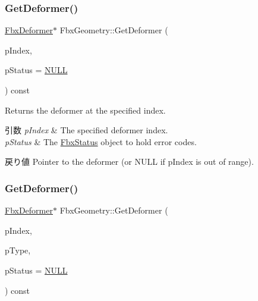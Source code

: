 \subsubsection{\texorpdfstring{Get\+Deformer()}{GetDeformer()}\hspace{0.1cm}{\footnotesize\ttfamily [1/2]}}
{\footnotesize\ttfamily \hyperlink{class_fbx_deformer}{Fbx\+Deformer}$\ast$ Fbx\+Geometry\+::\+Get\+Deformer (\begin{DoxyParamCaption}\item[{int}]{p\+Index,  }\item[{\hyperlink{class_fbx_status}{Fbx\+Status} $\ast$}]{p\+Status = {\ttfamily \hyperlink{fbxarch_8h_a070d2ce7b6bb7e5c05602aa8c308d0c4}{N\+U\+LL}} }\end{DoxyParamCaption}) const}

Returns the deformer at the specified index. 
\begin{DoxyParams}{引数}
{\em p\+Index} & The specified deformer index. \\
\hline
{\em p\+Status} & The \hyperlink{class_fbx_status}{Fbx\+Status} object to hold error codes. \\
\hline
\end{DoxyParams}
\begin{DoxyReturn}{戻り値}
Pointer to the deformer (or {\ttfamily N\+U\+LL} if p\+Index is out of range). 
\end{DoxyReturn}
\mbox{\label{class_fbx_geometry_aa283c85cdc0c5c3d2eae56952b6a41a0}} 
\subsubsection{\texorpdfstring{Get\+Deformer()}{GetDeformer()}\hspace{0.1cm}{\footnotesize\ttfamily [2/2]}}
{\footnotesize\ttfamily \hyperlink{class_fbx_deformer}{Fbx\+Deformer}$\ast$ Fbx\+Geometry\+::\+Get\+Deformer (\begin{DoxyParamCaption}\item[{int}]{p\+Index,  }\item[{\hyperlink{class_fbx_deformer_a07e2cfb767191ba5c8799fdfbfe3eaf6}{Fbx\+Deformer\+::\+E\+Deformer\+Type}}]{p\+Type,  }\item[{\hyperlink{class_fbx_status}{Fbx\+Status} $\ast$}]{p\+Status = {\ttfamily \hyperlink{fbxarch_8h_a070d2ce7b6bb7e5c05602aa8c308d0c4}{N\+U\+LL}} }\end{DoxyParamCaption}) const}

